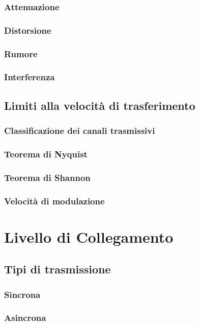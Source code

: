 \documentclass[a4paper,11pt]{paper}
\begin{document}
\subsubsection{Attenuazione}
\subsubsection{Distorsione}
\subsubsection{Rumore}
\subsubsection{Interferenza}

\subsection{Limiti alla velocità di trasferimento}
\subsubsection{Classificazione dei canali trasmissivi}
\subsubsection{Teorema di Nyquist}
\subsubsection{Teorema di Shannon}
\subsubsection{Velocità di modulazione}

\newpage
\section{Livello di Collegamento}

\subsection{Tipi di trasmissione}
\subsubsection{Sincrona}
\subsubsection{Asincrona}
\end{document}

